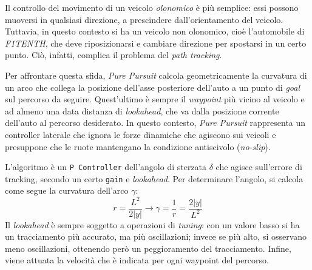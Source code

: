 Il controllo del movimento di un veicolo \textit{olonomico} è più semplice: essi possono muoversi in 
qualsiasi direzione, a prescindere dall'orientamento del veicolo. Tuttavia, in questo contesto si ha un
veicolo non olonomico, cioè l'automobile di \textit{F1TENTH}, che deve riposizionarsi e cambiare direzione per spostarsi in un 
certo punto. Ciò, infatti, complica il problema del \textit{path tracking}.

Per affrontare questa sfida, \textit{Pure Pursuit} calcola geometricamente 
la curvatura di un arco che collega la posizione dell'asse posteriore dell'auto a un punto di 
\textit{goal} sul percorso da seguire. Quest'ultimo è sempre il \textit{waypoint} più vicino
al veicolo e ad almeno una data distanza di \textit{lookahead}, che va dalla posizione corrente
dell'auto al percorso desiderato.
In questo contesto, \textit{Pure Pursuit} rappresenta un controller laterale che ignora le 
forze dinamiche che agiscono sui veicoli e presuppone che le ruote mantengano la condizione 
antiscivolo (\textit{no-slip}).

L'algoritmo è un \verb|P Controller| dell'angolo di sterzata $\delta$ che agisce sull'errore
di tracking, secondo un certo \verb|gain| e \textit{lookahead}. 
Per determinare l'angolo, si calcola come segue la curvatura dell'arco $\gamma$:
\begin{equation}
    r = \frac{L^2}{2|y|} \rightarrow \gamma = \frac{1}{r} = \frac{2|y|}{L^2}
\end{equation}
Il \textit{lookahead} è sempre soggetto a operazioni di \textit{tuning}: 
con un valore basso si ha un tracciamento più accurato, ma più oscillazioni;
invece se più alto, si osservano meno oscillazioni, ottenendo però un peggioramento del 
tracciamento. Infine, viene attuata la velocità che è indicata per ogni waypoint del percorso.

